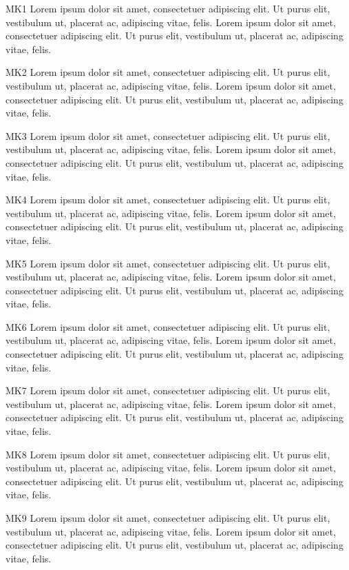 \documentclass[twocolumn]{article}
\begin{document}
MK1 Lorem ipsum dolor sit amet, consectetuer adipiscing elit. Ut purus elit, vestibulum ut, placerat ac, adipiscing vitae, felis. Lorem ipsum dolor sit amet, consectetuer adipiscing elit. Ut purus elit, vestibulum ut, placerat ac, adipiscing vitae, felis.\par
{}MK2 Lorem ipsum dolor sit amet, consectetuer adipiscing elit. Ut purus elit, vestibulum ut, placerat ac, adipiscing vitae, felis. Lorem ipsum dolor sit amet, consectetuer adipiscing elit. Ut purus elit, vestibulum ut, placerat ac, adipiscing vitae, felis.\par
{}MK3 Lorem ipsum dolor sit amet, consectetuer adipiscing elit. Ut purus elit, vestibulum ut, placerat ac, adipiscing vitae, felis. Lorem ipsum dolor sit amet, consectetuer adipiscing elit. Ut purus elit, vestibulum ut, placerat ac, adipiscing vitae, felis.\par
{}MK4 Lorem ipsum dolor sit amet, consectetuer adipiscing elit. Ut purus elit, vestibulum ut, placerat ac, adipiscing vitae, felis. Lorem ipsum dolor sit amet, consectetuer adipiscing elit. Ut purus elit, vestibulum ut, placerat ac, adipiscing vitae, felis.\par
{}MK5 Lorem ipsum dolor sit amet, consectetuer adipiscing elit. Ut purus elit, vestibulum ut, placerat ac, adipiscing vitae, felis. Lorem ipsum dolor sit amet, consectetuer adipiscing elit. Ut purus elit, vestibulum ut, placerat ac, adipiscing vitae, felis.\par
{}MK6 Lorem ipsum dolor sit amet, consectetuer adipiscing elit. Ut purus elit, vestibulum ut, placerat ac, adipiscing vitae, felis. Lorem ipsum dolor sit amet, consectetuer adipiscing elit. Ut purus elit, vestibulum ut, placerat ac, adipiscing vitae, felis.\par
{}MK7 Lorem ipsum dolor sit amet, consectetuer adipiscing elit. Ut purus elit, vestibulum ut, placerat ac, adipiscing vitae, felis. Lorem ipsum dolor sit amet, consectetuer adipiscing elit. Ut purus elit, vestibulum ut, placerat ac, adipiscing vitae, felis.\par
{}MK8 Lorem ipsum dolor sit amet, consectetuer adipiscing elit. Ut purus elit, vestibulum ut, placerat ac, adipiscing vitae, felis. Lorem ipsum dolor sit amet, consectetuer adipiscing elit. Ut purus elit, vestibulum ut, placerat ac, adipiscing vitae, felis.\par
{}
MK9 Lorem ipsum dolor sit amet, consectetuer adipiscing elit. Ut purus elit, vestibulum ut, placerat ac, adipiscing vitae, felis. Lorem ipsum dolor sit amet, consectetuer adipiscing elit. Ut purus elit, vestibulum ut, placerat ac, adipiscing vitae, felis.\par
\end{document}
